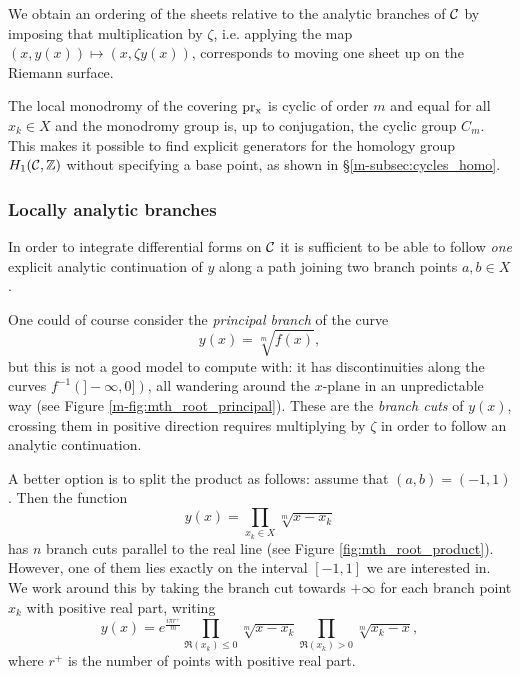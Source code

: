\documentclass[main.tex]{subfiles}
\begin{document}
  \bigskip

  We obtain an ordering of the sheets relative
  to the analytic branches of $\mathcal{C}$ by imposing that multiplication by $\zeta$,
  i.e. applying the map $(x,y(x)) \mapsto (x,\zeta y(x))$, corresponds to
  moving one sheet up on the Riemann surface.

  The local monodromy of the covering $\operatorname{pr_x}$ is cyclic of order $m$ and equal for all $x_k \in X$
 and the monodromy group is, up to conjugation, the cyclic group $C_m$. This makes it possible to find explicit generators for the
  homology group $H_1(\mathcal{C},\mathbb{Z})$ without specifying a base point, as shown in \S \ref{m-subsec:cycles_homo}.

  \subsubsection{Locally analytic branches}\label{subsubsec:analytic_branches}

  In order to integrate differential forms on $\mathcal{C}$
  it is sufficient to be able to follow \emph{one} explicit analytic continuation of $y$ along a
  path joining two branch points $a, b \in X$.

  One could of course consider the \emph{principal branch} of the curve
  \begin{equation*}
      y(x) = \sqrt[m]{f(x)},
  \end{equation*}
  but this is not a good model to compute with: it has
  discontinuities along the curves $f^{-1}(]\!-\infty,0])$, all
  wandering around the $x$-plane in an unpredictable way (see Figure \ref{m-fig:mth_root_principal}).
  These are the \textit{branch cuts} of $y(x)$, crossing them in positive direction
  requires multiplying by $\zeta$ in order to follow an analytic continuation.


  A better option is to split the product as follows:
  assume that $(a,b) = (-1,1)$. Then the function
  \begin{equation*}
      y(x) = \prod_{x_k\in X}\sqrt[m]{x-x_k}
  \end{equation*}
  has $n$ branch cuts parallel to the real line (see Figure \ref{fig:mth_root_product}).
  However, one of them lies exactly on the interval $[-1,1]$ we are interested in. We work around this
  by taking the branch cut towards $+\infty$ for each branch point $x_k$ with positive real part, writing
  \begin{equation*}
      y(x) = e^{\frac{iπr^+}m}\prod_{\Re(x_k)\leq0}\sqrt[m]{x-x_k} \prod_{\Re(x_k)>0}\sqrt[m]{x_k-x},
  \end{equation*}
  where $r^+$ is the number of points with positive real part.
\end{document}
